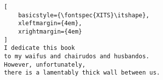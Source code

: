 
\cleardoublepage
\thispagestyle{empty}

\null\vfil

\begin{lstlisting}[
    basicstyle={\fontspec{XITS}\itshape},
    xleftmargin={4em},
    xrightmargin={4em}
]
I dedicate this book
to my waifus and chairudos and husbandos.
However, unfortunately,
there is a lamentably thick wall between us.
\end{lstlisting}

\vfil\null

\clearpage
\mbox{}%
\thispagestyle{empty}

\cleardoublepage

